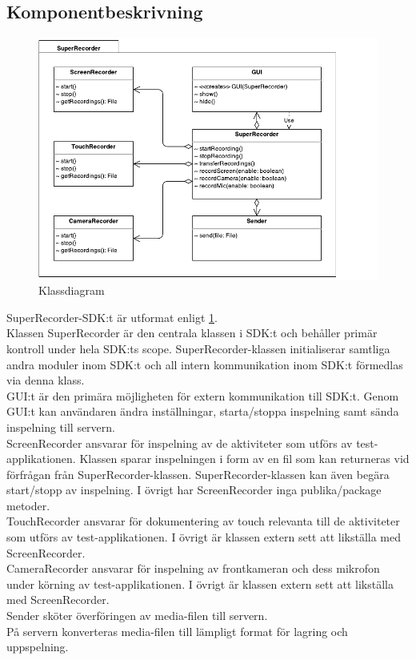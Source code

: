\subsection{Komponentbeskrivning}

\begin{figure}
\includegraphics{CrudeClassDiagram.pdf}
\caption{Klassdiagram}
\label{fig:CrudeClassDiagram}
\end{figure}

SuperRecorder-SDK:t är utformat enligt \ref{fig:CrudeClassDiagram}. \\

Klassen SuperRecorder är den centrala klassen i SDK:t och behåller primär kontroll under hela SDK:ts scope. SuperRecorder-klassen initialiserar samtliga andra moduler inom SDK:t och all intern kommunikation inom SDK:t förmedlas via denna klass. \\

GUI:t är den primära möjligheten för extern kommunikation till SDK:t. Genom GUI:t kan användaren ändra inställningar, starta/stoppa inspelning samt sända inspelning till servern. \\

ScreenRecorder ansvarar för inspelning av de aktiviteter som utförs av test-applikationen. Klassen sparar inspelningen i form av en fil som kan returneras vid förfrågan från SuperRecorder-klassen. SuperRecorder-klassen kan även begära start/stopp av inspelning. I övrigt har ScreenRecorder inga publika/package metoder. \\

TouchRecorder ansvarar för dokumentering av touch relevanta till de aktiviteter som utförs av test-applikationen. I övrigt är klassen extern sett att likställa med ScreenRecorder. \\

CameraRecorder ansvarar för inspelning av frontkameran och dess mikrofon under körning av test-applikationen. I övrigt är klassen extern sett att likställa med ScreenRecorder. \\

Sender sköter överföringen av media-filen till servern. \\

På servern konverteras media-filen till lämpligt format för lagring och uppspelning.
